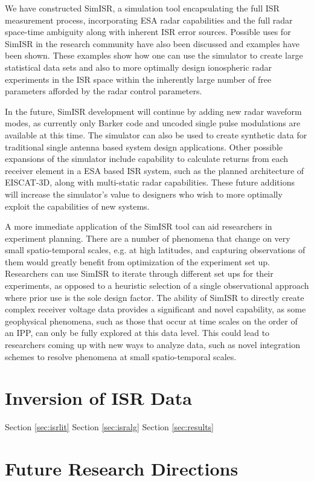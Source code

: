 We have constructed SimISR, a simulation tool encapsulating the full ISR measurement process, incorporating ESA radar capabilities and the full radar space-time ambiguity along with inherent ISR error sources. Possible uses for SimISR in the research community have also been discussed and examples have been shown. These examples show how one can use the simulator to create large statistical data sets and also to more optimally design ionospheric radar experiments in the ISR space within the inherently large number of free parameters afforded by the radar control parameters. 

In the future, SimISR development will continue by adding new radar waveform modes, as currently only Barker code and uncoded single pulse modulations are available at this time. The simulator can also be used to create synthetic data for traditional single antenna based system design applications. Other possible expansions of the simulator include capability to calculate returns from each receiver element in a ESA based ISR system, such as the planned architecture of EISCAT-3D, along with multi-static radar capabilities. These future additions will increase the simulator's value to designers who wish to more optimally exploit the capabilities of new systems. 

A more immediate application of the SimISR tool can aid researchers in experiment planning. There are a number of phenomena that change on very small spatio-temporal scales, e.g. at high latitudes, and capturing observations of them would greatly benefit from optimization of the experiment set up. Researchers can use SimISR to iterate through different set ups for their experiments, as opposed to a heuristic selection of a single observational approach where prior use is the sole design factor. The ability of SimISR to directly create complex receiver voltage data provides a significant and novel capability, as some geophysical phenomena, such as those that occur at time scales on the order of an IPP, can only be fully explored at this data level. This could lead to researchers coming up with new ways to analyze data, such as novel integration schemes to resolve phenomena at small spatio-temporal scales.

\section{Inversion of ISR Data}
Section \ref{sec:isrlit} Section \ref{sec:isralg} Section \ref{sec:results}
\section{Future Research Directions}

